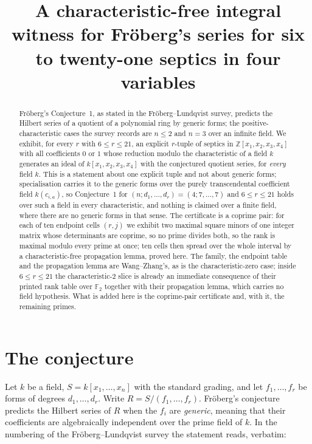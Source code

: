 \documentclass[11pt]{amsart}
\title[A characteristic-free witness for six to twenty-one septics]
{A characteristic-free integral witness for Fr\"oberg's series for six to
twenty-one septics in four variables}
\date{}
\theoremstyle{remark}
\newcommand{\ZZ}{\mathbb Z}
\newcommand{\FF}{\mathbb F}
\begin{document}
\begin{abstract}
Fr\"oberg's Conjecture~1, as stated in the Fr\"oberg--Lundqvist survey, predicts
the Hilbert series of a quotient of a polynomial ring by generic forms; the
positive-characteristic cases the survey records are $n\le 2$ and $n=3$ over an
infinite field. We exhibit, for every $r$ with $6\le r\le 21$, an explicit
$r$-tuple of septics in $\ZZ[x_1,x_2,x_3,x_4]$ with all coefficients $0$ or $1$
whose reduction modulo the characteristic of a field $k$ generates an ideal of
$k[x_1,x_2,x_3,x_4]$ with the conjectured quotient series, for \emph{every}
field $k$. This is a statement about one explicit tuple and not about generic
forms; specialisation carries it to the generic forms over the purely
transcendental coefficient field $k(c_{i,a})$, so Conjecture~1 for
$(n;d_1,\dots,d_r)=(4;7,\dots,7)$ and $6\le r\le21$ holds over such a field in
every characteristic, and nothing is claimed over a finite field, where there
are no generic forms in that sense. The certificate is a coprime pair: for
each of ten endpoint cells $(r,j)$ we exhibit two maximal square minors of one
integer matrix whose determinants are coprime, so no prime divides both, so the
rank is maximal modulo every prime at once; ten cells then spread over the whole
interval by a characteristic-free propagation lemma, proved here. The family,
the endpoint table and the propagation lemma are Wang--Zhang's, as is the
characteristic-zero case; inside $6\le r\le21$ the characteristic-$2$ slice is
already an immediate consequence of their printed rank table over $\FF_2$
together with their propagation lemma, which carries no field hypothesis. What
is added here is the coprime-pair certificate and, with it, the remaining
primes.
\end{abstract}

\maketitle

\section{The conjecture}

Let $k$ be a field, $S=k[x_1,\dots,x_n]$ with the standard grading, and let
$f_1,\dots,f_r$ be forms of degrees $d_1,\dots,d_r$. Write
$R=S/(f_1,\dots,f_r)$. Fr\"oberg's conjecture predicts the Hilbert series of $R$
when the $f_i$ are \emph{generic}, meaning that their coefficients are
algebraically independent over the prime field of $k$. In the numbering of the
Fr\"oberg--Lundqvist survey \cite[Conjecture~1]{FL} the statement reads,
verbatim:
\end{document}
